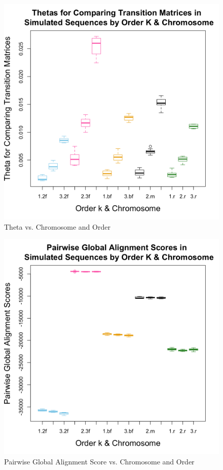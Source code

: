\documentclass[12pt]{article}
\begin{document}
\begin{figure}
  \centering
  \includegraphics[scale=0.25]{theta.png}
  \caption{Theta vs. Chromosome and Order\label{fig:theta}}
\end{figure}
\begin{figure}
  \centering
  \includegraphics[scale=0.25]{pairwise.png}
  \caption{Pairwise Global Alignment Score vs. Chromosome and Order\label{fig:pairwise}}
\end{figure}
\end{document}
